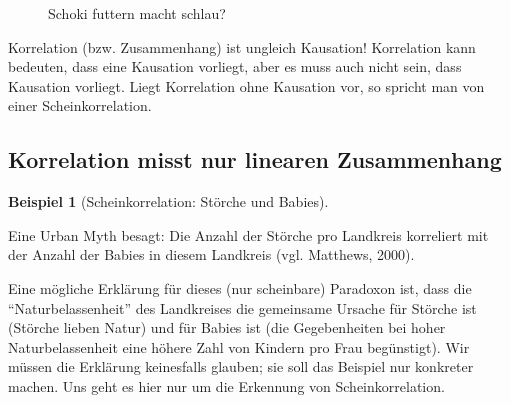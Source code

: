 \documentclass[
  letterpaper,
]{scrbook}
\theoremstyle{definition}
\newtheorem{example}{Beispiel}[chapter]
\theoremstyle{definition}
\theoremstyle{definition}
\theoremstyle{remark}
\begin{document}
\begin{figure}


\caption{\label{fig-schoki}Schoki futtern macht schlau?}

\end{figure}%

Korrelation (bzw. Zusammenhang) ist ungleich Kausation! Korrelation kann
bedeuten, dass eine Kausation vorliegt, aber es muss auch nicht sein,
dass Kausation vorliegt. Liegt Korrelation ohne Kausation vor, so
spricht man von einer Scheinkorrelation.

\subsection{Korrelation misst nur linearen
Zusammenhang}\label{korrelation-misst-nur-linearen-zusammenhang}

\begin{example}[Scheinkorrelation: Störche und
Babies]\protect\hypertarget{exm-scheinkorr}{}\label{exm-scheinkorr}

Eine Urban Myth besagt: Die Anzahl der Störche pro Landkreis korreliert
mit der Anzahl der Babies in diesem Landkreis (vgl. Matthews, 2000).

Eine mögliche Erklärung für dieses (nur scheinbare) Paradoxon ist, dass
die ``Naturbelassenheit'' des Landkreises die gemeinsame Ursache für
Störche ist (Störche lieben Natur) und für Babies ist (die Gegebenheiten
bei hoher Naturbelassenheit eine höhere Zahl von Kindern pro Frau
begünstigt). Wir müssen die Erklärung keinesfalls glauben; sie soll das
Beispiel nur konkreter machen. Uns geht es hier nur um die Erkennung von
Scheinkorrelation.

\end{example}
\end{document}
